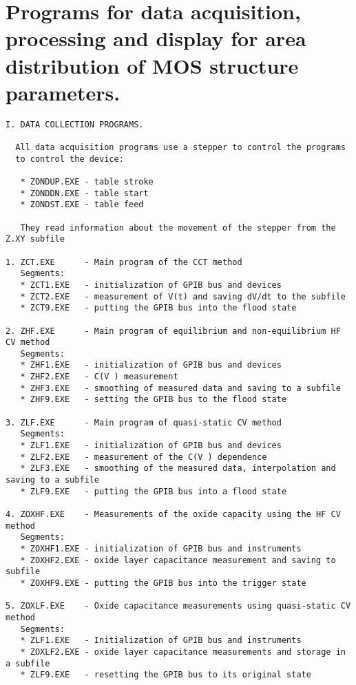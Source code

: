
\chapter{Programs for data acquisition, processing and display for area distribution of MOS structure parameters.}\label{app:AppendixH}

\begin{verbatim}
I. DATA COLLECTION PROGRAMS.

  All data acquisition programs use a stepper to control the programs
  to control the device:

   * ZONDUP.EXE - table stroke
   * ZONDDN.EXE - table start
   * ZONDST.EXE - table feed

   They read information about the movement of the stepper from the Z.XY subfile

1. ZCT.EXE      - Main program of the CCT method
   Segments:
   * ZCT1.EXE   - initialization of GPIB bus and devices
   * ZCT2.EXE   - measurement of V(t) and saving dV/dt to the subfile
   * ZCT9.EXE   - putting the GPIB bus into the flood state

2. ZHF.EXE      - Main program of equilibrium and non-equilibrium HF CV method
   Segments:
   * ZHF1.EXE   - initialization of GPIB bus and devices
   * ZHF2.EXE   - C(V ) measurement
   * ZHF3.EXE   - smoothing of measured data and saving to a subfile
   * ZHF9.EXE   - setting the GPIB bus to the flood state

3. ZLF.EXE      - Main program of quasi-static CV method
   Segments:
   * ZLF1.EXE   - initialization of GPIB bus and devices
   * ZLF2.EXE   - measurement of the C(V ) dependence
   * ZLF3.EXE   - smoothing of the measured data, interpolation and saving to a subfile
   * ZLF9.EXE   - putting the GPIB bus into a flood state

4. ZOXHF.EXE    - Measurements of the oxide capacity using the HF CV method
   Segments:
   * ZOXHF1.EXE - initialization of GPIB bus and instruments
   * ZOXHF2.EXE - oxide layer capacitance measurement and saving to subfile
   * ZOXHF9.EXE - putting the GPIB bus into the trigger state

5. ZOXLF.EXE    - Oxide capacitance measurements using quasi-static CV method
   Segments:
   * ZLF1.EXE   - Initialization of GPIB bus and instruments
   * ZOXLF2.EXE - oxide layer capacitance measurements and storage in a subfile
   * ZLF9.EXE   - resetting the GPIB bus to its original state



\end{verbatim}
